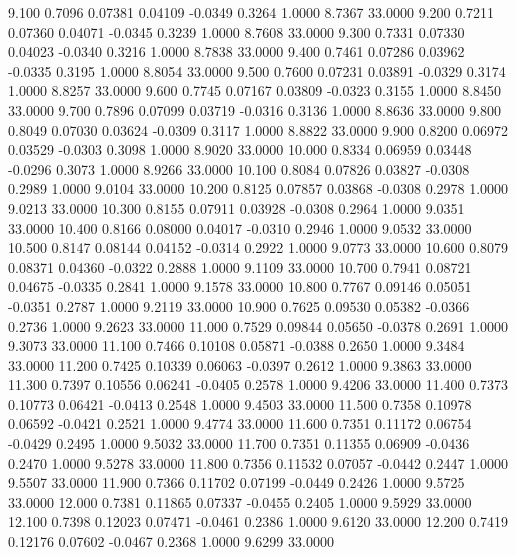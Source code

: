   9.100   0.7096   0.07381   0.04109  -0.0349   0.3264   1.0000   8.7367  33.0000
   9.200   0.7211   0.07360   0.04071  -0.0345   0.3239   1.0000   8.7608  33.0000
   9.300   0.7331   0.07330   0.04023  -0.0340   0.3216   1.0000   8.7838  33.0000
   9.400   0.7461   0.07286   0.03962  -0.0335   0.3195   1.0000   8.8054  33.0000
   9.500   0.7600   0.07231   0.03891  -0.0329   0.3174   1.0000   8.8257  33.0000
   9.600   0.7745   0.07167   0.03809  -0.0323   0.3155   1.0000   8.8450  33.0000
   9.700   0.7896   0.07099   0.03719  -0.0316   0.3136   1.0000   8.8636  33.0000
   9.800   0.8049   0.07030   0.03624  -0.0309   0.3117   1.0000   8.8822  33.0000
   9.900   0.8200   0.06972   0.03529  -0.0303   0.3098   1.0000   8.9020  33.0000
  10.000   0.8334   0.06959   0.03448  -0.0296   0.3073   1.0000   8.9266  33.0000
  10.100   0.8084   0.07826   0.03827  -0.0308   0.2989   1.0000   9.0104  33.0000
  10.200   0.8125   0.07857   0.03868  -0.0308   0.2978   1.0000   9.0213  33.0000
  10.300   0.8155   0.07911   0.03928  -0.0308   0.2964   1.0000   9.0351  33.0000
  10.400   0.8166   0.08000   0.04017  -0.0310   0.2946   1.0000   9.0532  33.0000
  10.500   0.8147   0.08144   0.04152  -0.0314   0.2922   1.0000   9.0773  33.0000
  10.600   0.8079   0.08371   0.04360  -0.0322   0.2888   1.0000   9.1109  33.0000
  10.700   0.7941   0.08721   0.04675  -0.0335   0.2841   1.0000   9.1578  33.0000
  10.800   0.7767   0.09146   0.05051  -0.0351   0.2787   1.0000   9.2119  33.0000
  10.900   0.7625   0.09530   0.05382  -0.0366   0.2736   1.0000   9.2623  33.0000
  11.000   0.7529   0.09844   0.05650  -0.0378   0.2691   1.0000   9.3073  33.0000
  11.100   0.7466   0.10108   0.05871  -0.0388   0.2650   1.0000   9.3484  33.0000
  11.200   0.7425   0.10339   0.06063  -0.0397   0.2612   1.0000   9.3863  33.0000
  11.300   0.7397   0.10556   0.06241  -0.0405   0.2578   1.0000   9.4206  33.0000
  11.400   0.7373   0.10773   0.06421  -0.0413   0.2548   1.0000   9.4503  33.0000
  11.500   0.7358   0.10978   0.06592  -0.0421   0.2521   1.0000   9.4774  33.0000
  11.600   0.7351   0.11172   0.06754  -0.0429   0.2495   1.0000   9.5032  33.0000
  11.700   0.7351   0.11355   0.06909  -0.0436   0.2470   1.0000   9.5278  33.0000
  11.800   0.7356   0.11532   0.07057  -0.0442   0.2447   1.0000   9.5507  33.0000
  11.900   0.7366   0.11702   0.07199  -0.0449   0.2426   1.0000   9.5725  33.0000
  12.000   0.7381   0.11865   0.07337  -0.0455   0.2405   1.0000   9.5929  33.0000
  12.100   0.7398   0.12023   0.07471  -0.0461   0.2386   1.0000   9.6120  33.0000
  12.200   0.7419   0.12176   0.07602  -0.0467   0.2368   1.0000   9.6299  33.0000
